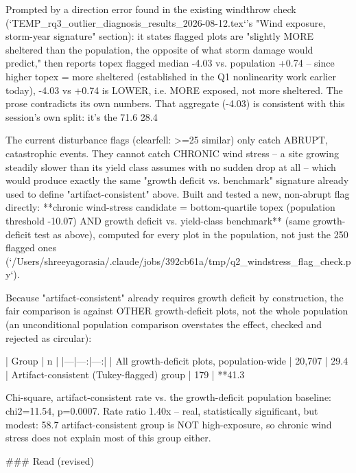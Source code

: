 Prompted by a direction error found in the existing windthrow check
(`TEMP_rq3_outlier_diagnosis_results_2026-08-12.tex`'s "Wind exposure, storm-year signature"
section): it states flagged plots are "slightly MORE sheltered than the population, the opposite
of what storm damage would predict," then reports topex flagged median -4.03 vs. population
+0.74 -- since higher topex = more sheltered (established in the Q1 nonlinearity work earlier
today), -4.03 vs +0.74 is LOWER, i.e. MORE exposed, not more sheltered. The prose contradicts its
own numbers. That aggregate (-4.03) is consistent with this session's own split: it's the
71.6%
28.4%

The current disturbance flags (clearfell: >=25%
similar) only catch ABRUPT, catastrophic events. They cannot catch CHRONIC wind stress -- a site
growing steadily slower than its yield class assumes with no sudden drop at all -- which would
produce exactly the same "growth deficit vs. benchmark" signature already used to define
"artifact-consistent" above. Built and tested a new, non-abrupt flag directly:
**chronic wind-stress candidate = bottom-quartile topex (population threshold -10.07) AND
growth deficit vs. yield-class benchmark** (same growth-deficit test as above), computed for
every plot in the population, not just the 250 flagged ones
(`/Users/shreeyagorasia/.claude/jobs/392cb61a/tmp/q2_windstress_flag_check.py`).

Because "artifact-consistent" already requires growth deficit by construction, the fair
comparison is against OTHER growth-deficit plots, not the whole population (an unconditional
population comparison overstates the effect, checked and rejected as circular):

| Group | n | %
|---|---:|---:|
| All growth-deficit plots, population-wide | 20,707 | 29.4%
| Artifact-consistent (Tukey-flagged) group | 179 | **41.3%

Chi-square, artifact-consistent rate vs. the growth-deficit population baseline: chi2=11.54,
p=0.0007. Rate ratio 1.40x -- real, statistically significant, but modest: 58.7%
artifact-consistent group is NOT high-exposure, so chronic wind stress does not explain most of
this group either.

### Read (revised)

